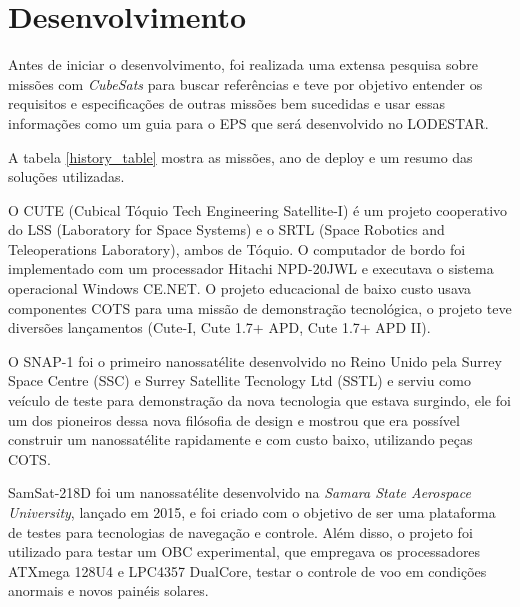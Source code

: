 \chapter{Desenvolvimento} \label{desenvolvimento}


Antes de iniciar o desenvolvimento, foi realizada uma extensa pesquisa sobre missões com \textit{CubeSats} para buscar referências e teve por objetivo entender os requisitos e especificações de outras missões bem sucedidas e usar essas informações como um guia para o EPS que será desenvolvido no LODESTAR. 

A tabela \ref{history_table} mostra as missões, ano de deploy e um resumo das soluções utilizadas.



O CUTE \cite{cute1_ref} (Cubical  Tóquio  Tech  Engineering  Satellite-I) é um projeto cooperativo do LSS (Laboratory for Space Systems) e o SRTL (Space Robotics and Teleoperations Laboratory), ambos de Tóquio. O computador de bordo foi implementado com um processador Hitachi NPD-20JWL e executava o sistema operacional Windows CE.NET. O  projeto  educacional  de  baixo  custo  usava componentes COTS para uma missão de demonstração tecnológica, o projeto teve diversões lançamentos (Cute-I, Cute 1.7+ APD, Cute 1.7+ APD II). 

O SNAP-1 \cite{snap1_ref} foi o primeiro nanossatélite desenvolvido no Reino Unido pela Surrey Space Centre (SSC) e Surrey Satellite Tecnology Ltd (SSTL) e serviu como veículo de teste para demonstração da nova tecnologia que estava surgindo, ele foi um dos pioneiros dessa nova filósofia de design e mostrou que era possível construir um nanossatélite rapidamente e com custo baixo, utilizando peças COTS.

SamSat-218D \cite{samsat218_ref} foi um nanossatélite desenvolvido na \textit{Samara State Aerospace University}, lançado em 2015, e foi criado com o objetivo de ser uma plataforma de testes para tecnologias de navegação e controle. Além disso, o projeto foi utilizado para testar um OBC experimental, que empregava os processadores ATXmega 128U4 e LPC4357 DualCore, testar o controle de voo em condições anormais e novos painéis solares.

